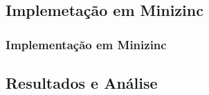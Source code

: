 \documentclass{beamer}
\begin{document}
\subsection{Implemetação em Minizinc}

\begin{frame}[allowframebreaks=0.9]
\frametitle{Implementação em Minizinc}



\end{frame}



\subsection{Resultados e Análise}
\end{document}
